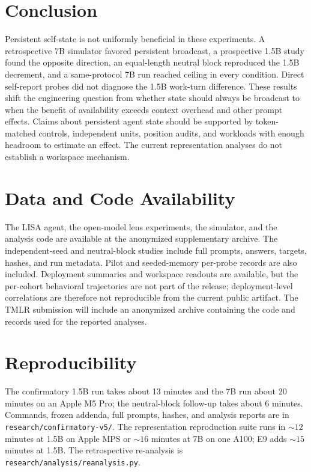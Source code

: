 \documentclass{article}
\begin{document}
\section{Conclusion}
Persistent self-state is not uniformly beneficial in these experiments. A retrospective 7B simulator favored persistent broadcast, a prospective 1.5B study found the opposite direction, an equal-length neutral block reproduced the 1.5B decrement, and a same-protocol 7B run reached ceiling in every condition. Direct self-report probes did not diagnose the 1.5B work-turn difference. These results shift the engineering question from whether state should always be broadcast to when the benefit of availability exceeds context overhead and other prompt effects. Claims about persistent agent state should be supported by token-matched controls, independent units, position audits, and workloads with enough headroom to estimate an effect. The current representation analyses do not establish a workspace mechanism.

\section*{Data and Code Availability}
The LISA agent, the open-model lens experiments, the simulator, and the analysis code are available at the anonymized supplementary archive. The independent-seed and neutral-block studies include full prompts, answers, targets, hashes, and run metadata. Pilot and seeded-memory per-probe records are also included. Deployment summaries and workspace readouts are available, but the per-cohort behavioral trajectories are not part of the release; deployment-level correlations are therefore not reproducible from the current public artifact. The TMLR submission will include an anonymized archive containing the code and records used for the reported analyses.

\section*{Reproducibility}
The confirmatory 1.5B run takes about 13 minutes and the 7B run about 20 minutes on an Apple M5 Pro; the neutral-block follow-up takes about 6 minutes. Commands, frozen addenda, full prompts, hashes, and analysis reports are in \texttt{research/confirmatory-v5/}. The representation reproduction suite runs in ${\sim}12$ minutes at 1.5B on Apple MPS or ${\sim}16$ minutes at 7B on one A100; E9 adds ${\sim}15$ minutes at 1.5B. The retrospective re-analysis is \texttt{research/analysis/reanalysis.py}.
\end{document}
